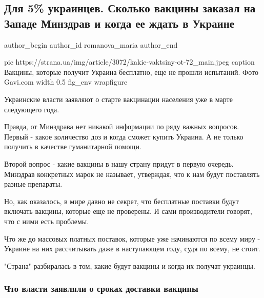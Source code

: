  
 
 
 
 
 
\subsection{Для 5\% украинцев. Сколько вакцины заказал на Западе Минздрав и когда ее ждать в Украине}
\label{sec:17_12_2020.news.ua.strana.romanova_maria.1.vaccine_ukraina_5_percent}
\ifcmt
	author_begin
   author_id romanova_maria
	author_end
\fi

\ifcmt
  pic https://strana.ua/img/article/3072/kakie-vaktsiny-ot-72_main.jpeg
  caption Вакцины, которые получит Украина бесплатно, еще не прошли испытаний. Фото Gavi.com 
  width 0.5
  fig_env wrapfigure
\fi

Украинские власти заявляют о старте вакцинации населения уже в марте следующего
года. 

Правда, от Минздрава нет никакой информации по ряду важных вопросов. Первый -
какое количество доз и когда сможет купить Украина. А не только получить в
качестве гуманитарной помощи.

Второй вопрос - какие вакцины в нашу страну придут в первую очередь. Минздрав
конкретных марок не называет, утверждая, что к нам будут поставлять разные
препараты.

Но, как оказалось, в мире давно не секрет, что бесплатные поставки будут
включать вакцины, которые еще не проверены. И сами производители говорят, что с
ними есть проблемы. 

Что же до массовых платных поставок, которые уже начинаются по всему миру -
Украине на них рассчитывать даже в наступающем году, судя по всему, не стоит. 

"Страна" разбиралась в том, какие будут вакцины и когда их получат украинцы. 

\subsubsection{Что власти заявляли о сроках доставки вакцины}

